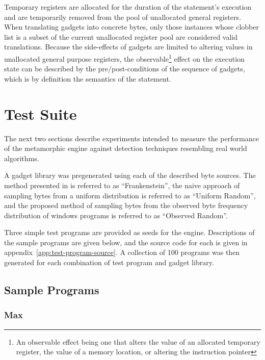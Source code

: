         Temporary registers are allocated for the duration of the
        statement's execution and are temporarily removed from the pool of
        unallocated general registers. When translating gadgets into
        concrete bytes, only those instances whose clobber list is a subset
        of the current unallocated register pool are considered valid
        translations. Because the side-effects of gadgets are limited to
        altering values in unallocated general purpose registers, the
        observable\footnote{An observable effect being one that alters the
        value of an allocated temporary register, the value of a memory
        location, or altering the instruction pointer} effect on the
        execution state can be described by the pre/post-conditions of the
        sequence of gadgets, which is by definition the semantics of the
        statement.
    
\section{Test Suite}

    The next two sections describe experiments intended to measure the
    performance of the metamorphic engine against detection techniques
    resembling real world algorithms.

    A gadget library was pregenerated using each of the described byte
    sources.  The method presented in \cite{franken} is referred to as
    ``Frankenstein'', the naive approach of sampling bytes from a uniform
    distribution is referred to as ``Uniform Random'', and the proposed
    method of sampling bytes from the observed byte frequency distribution
    of windows programs is referred to as ``Observed Random''.

    Three simple test programs are provided as seeds for the engine.
    Descriptions of the sample programs are given below, and the source code
    for each is given in appendix~\ref{app:test-program-source}. A
    collection of 100 programs was then generated for each combination of
    test program and gadget library.
    
    \subsection{Sample Programs}

        \subsubsection{Max}

